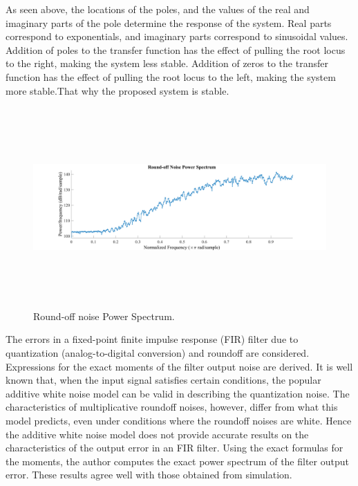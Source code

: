 As seen above, the locations of the poles, and the values of the real and imaginary parts of the pole determine the response of the system. Real parts correspond to exponentials, and imaginary parts correspond to sinusoidal values. Addition of poles to the transfer function has the effect of pulling the root locus to the right, making the system less stable. Addition of zeros to the transfer function has the effect of pulling the root locus to the left, making the system more stable.That why the proposed system is stable.
\begin{figure}[H]
	\begin{Center}
		\includegraphics[width=6.5in,height=3in]{25}
		\caption{ Round-off noise Power Spectrum.}
		\label{fig:_11_Roundoff_noise_Power_Spectrum}
	\end{Center}
\end{figure}
The errors in a fixed-point finite impulse response (FIR) filter due to quantization (analog-to-digital conversion) and roundoff are considered. Expressions for the exact moments of the filter output noise are derived. It is well known that, when the input signal satisfies certain conditions, the popular additive white noise model can be valid in describing the quantization noise. The characteristics of multiplicative roundoff noises, however, differ from what this model predicts, even under conditions where the roundoff noises are white. Hence the additive white noise model does not provide accurate results on the characteristics of the output error in an FIR filter. Using the exact formulas for the moments, the author computes the exact power spectrum of the filter output error. These results agree well with those obtained from simulation.
